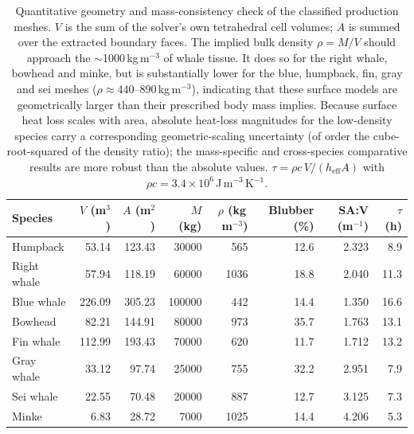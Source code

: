 \begin{table}[htbp]
\centering
\caption{Quantitative geometry and mass-consistency check of the classified production meshes. $V$ is the sum of the solver's own tetrahedral cell volumes; $A$ is summed over the extracted boundary faces. The implied bulk density $\rho=M/V$ should approach the $\sim$1000\,kg\,m$^{-3}$ of whale tissue. It does so for the right whale, bowhead and minke, but is substantially lower for the blue, humpback, fin, gray and sei meshes ($\rho\approx440$--890\,kg\,m$^{-3}$), indicating that these surface models are geometrically larger than their prescribed body mass implies. Because surface heat loss scales with area, absolute heat-loss magnitudes for the low-density species carry a corresponding geometric-scaling uncertainty (of order the cube-root-squared of the density ratio); the mass-specific and cross-species comparative results are more robust than the absolute values. $\tau=\rho c\,V/(h_{\mathrm{eff}}A)$ with $\rho c=3.4\times10^{6}$\,J\,m$^{-3}$\,K$^{-1}$.}
\label{tab:geometry}
\begin{tabular}{lrrrrrrr}
\hline
Species & $V$ (m$^3$) & $A$ (m$^2$) & $M$ (kg) & $\rho$ (kg\,m$^{-3}$) & Blubber (\%) & SA:V (m$^{-1}$) & $\tau$ (h) \\
\hline
Humpback & 53.14 & 123.43 & 30000 & 565 & 12.6 & 2.323 & 8.9 \\
Right whale & 57.94 & 118.19 & 60000 & 1036 & 18.8 & 2.040 & 11.3 \\
Blue whale & 226.09 & 305.23 & 100000 & 442 & 14.4 & 1.350 & 16.6 \\
Bowhead & 82.21 & 144.91 & 80000 & 973 & 35.7 & 1.763 & 13.1 \\
Fin whale & 112.99 & 193.43 & 70000 & 620 & 11.7 & 1.712 & 13.2 \\
Gray whale & 33.12 & 97.74 & 25000 & 755 & 32.2 & 2.951 & 7.9 \\
Sei whale & 22.55 & 70.48 & 20000 & 887 & 12.7 & 3.125 & 7.3 \\
Minke & 6.83 & 28.72 & 7000 & 1025 & 14.4 & 4.206 & 5.3 \\
\hline
\end{tabular}
\end{table}
